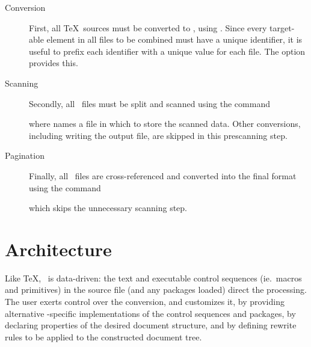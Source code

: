 \documentclass{report}
\begin{document}
\begin{description}
\item[Conversion] First, all \TeX\ sources must be converted
   to \XML, using .  Since every target-able element
   in all files to be combined must have a unique identifier, it is useful to
   prefix each identifier with a unique value for each file. 
   The  option  provides this.

 \item[Scanning] Secondly, all \XML\ files must be split and scanned using
  the command
  \begin{quote}
  \end{quote}
  where  names a file in which to store the scanned data.
  Other conversions, including writing the output file, are skipped in this prescanning step.
 
 \item[Pagination] Finally, all \XML\ files are cross-referenced and converted into
   the final format using the command
   \begin{quote}
   \end{quote}
   which skips the unnecessary scanning step.
\end{description}

\chapter{Architecture}\label{architecture}
Like \TeX, \LaTeXML\ is data-driven: the text and executable control
sequences (ie.~macros and primitives)
in the source file (and any packages loaded) direct the processing.
The user exerts control over the conversion, and customizes it, by 
providing alternative \LaTeXML-specific implementations of the control sequences and packages,
by declaring properties of the desired document structure,
and by defining rewrite rules to be applied to the constructed document tree.
\end{document}
